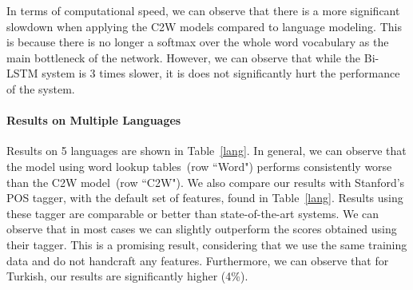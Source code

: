 \documentclass[11pt]{article}
\begin{document}
\begin{CJK*}{UTF8}{gbsn}
In terms of computational speed, we can observe that there is a more significant slowdown when applying the C2W models compared to language modeling. This is because there is no longer a softmax over the whole word vocabulary as the main bottleneck of the network. However, we can observe that while the Bi-LSTM system is 3 times slower, it is does not significantly hurt the performance of the system.

\begin{table}
\begin{center}
\end{center}
\caption{\label{wsjtest} POS accuracy results for the English PTB using word representation models.}
\end{table}

\paragraph{Results on Multiple Languages}
Results on 5 languages are shown in Table~\ref{lang}. In general, we can observe that the model using word lookup tables~(row ``Word") performs consistently worse than the C2W model~(row ``C2W"). We also compare our results with Stanford's POS tagger, with the default set of features, found in Table~\ref{lang}. Results using these tagger are comparable or better than state-of-the-art systems. We can observe that in most cases we can slightly outperform the scores obtained using their tagger. This is a promising result, considering that we use the same training data and do not handcraft any features.  Furthermore, we can observe that for Turkish, our results are significantly higher (4\%). 


\end{CJK*}
\end{document}
